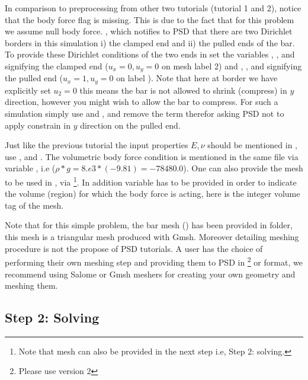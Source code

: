 In comparison to preprocessing from other two tutorials (tutorial 1 and
2), notice that the body force flag  is
missing. This is due to the fact that for this problem we assume null
body force. , which notifies to PSD that
there are two Dirichlet borders in this simulation i) the clamped end
and ii) the pulled ends of the bar. To provide these Dirichlet
conditions of the two ends in  set the
variables , , and 
signifying the clamped end (\(u_x=0,u_y=0\) on mesh label 2) and
, , and  signifying the
pulled end (\(u_x=1,u_y=0\) on label ). Note that here at border
 we have explicitly set \(u_2=0\) this means the bar is not
allowed to shrink (compress) in \(y\) direction, however you might wish
to allow the bar to compress. For such a simulation simply use
 and , and remove the term 
therefor asking PSD not to apply constrain in \(y\) direction on the
pulled end.

Just like the previous tutorial the input properties \(E,\nu\) should be
mentioned in , use , and
. The volumetric body force condition is mentioned in the
same file via variable , i.e
(\(\rho*g=8.e3*(-9.81)=-78480.0\)). One can also provide the mesh to be
used in  , via
\footnote{Note that mesh can also be provided in the next step i.e, Step 2: solving.}.
In addition variable  has to be provided in order to
indicate the volume (region) for which the body force is acting, here
 is the integer volume tag of the mesh.

Note that for this simple problem, the bar mesh () has been
provided in  folder, this mesh is a triangular mesh
produced with Gmsh. Moreover detailing meshing procedure is not the
propose of PSD tutorials. A user has the choice of performing their own
meshing step and providing them to PSD in
\footnote{Please use version 2} or  format, we
recommend using Salome or Gmsh meshers for creating your own geometry
and meshing them.

\subsection{Step 2: Solving}

